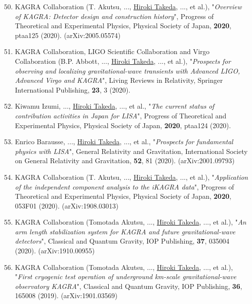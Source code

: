 \documentclass[uplatex, 11pt]{jsarticle}
\begin{document}
\begin{enumerate}
 \setcounter{enumi}{49}
\item KAGRA Collaboration (T. Akutsu, ..., \uline{Hiroki Takeda}, ..., et al.), "\emph{Overview of KAGRA: Detector design and construction history}", Progress of Theoretical and Experimental Physics, Physical Society of Japan, {\bf 2020}, ptaa125 (2020). (arXiv:2005.05574)\\

\item KAGRA Collaboration, LIGO Scientific Collaboration and Virgo Collaboration (B.P. Abbott, ..., \uline{Hiroki Takeda}, ..., et al.), "\emph{Prospects for observing and localizing gravitational-wave transients with Advanced LIGO, Advanced Virgo and KAGRA}", Living Reviews in Relativity, Springer International Publishing, {\bf 23}, 3 (2020).\\

\item Kiwamu Izumi, ..., \uline{Hiroki Takeda}, ..., et al., "\emph{The current status of contribution activities in Japan for LISA}", Progress of Theoretical and Experimental Physics, Physical Society of Japan, {\bf 2020}, ptaa124 (2020).\\

\item Enrico Barausse, ..., \uline{Hiroki Takeda}, ..., et al., "\emph{Prospects for fundamental physics with LISA}", General Relativity and Gravitation, International Society on General Relativity and Gravitation, {\bf 52}, 81 (2020). (arXiv:2001.09793)\\

\item KAGRA Collaboration (T. Akutsu, ..., \uline{Hiroki Takeda}, ..., et al.), "\emph{Application of the independent component analysis to the iKAGRA data}", Progress of Theoretical and Experimental Physics, Physical Society of Japan, {\bf 2020}, 053F01 (2020). (arXiv:1908.03013)\\

\item KAGRA Collaboration (Tomotada Akutsu, ..., \uline{Hiroki Takeda}, ..., et al.), "\emph{An arm length stabilization system for KAGRA and future gravitational-wave detectors}", Classical and Quantum Gravity, IOP Publishing, {\bf 37}, 035004 (2020). (arXiv:1910.00955)\\

\item KAGRA Collaboration (Tomotada Akutsu, ..., \uline{Hiroki Takeda}, ..., et al.), "\emph{First cryogenic test operation of underground km-scale gravitational-wave observatory KAGRA}", Classical and Quantum Gravity, IOP Publishing, {\bf 36}, 165008 (2019). (arXiv:1901.03569)\\


\end{enumerate}
\end{document}
